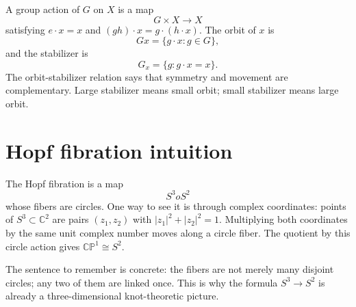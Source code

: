 A group action of \(G\) on \(X\) is a map
\[
  G\times X\to X
\]
satisfying \(e\cdot x=x\) and \((gh)\cdot x=g\cdot(h\cdot x)\).  The orbit of \(x\) is
\[
  Gx=\{g\cdot x:g\in G\},
\]
and the stabilizer is
\[
  G_x=\{g:g\cdot x=x\}.
\]
The orbit-stabilizer relation says that symmetry and movement are complementary.  Large stabilizer means small orbit; small stabilizer means large orbit.

\section{Hopf fibration intuition}

The Hopf fibration is a map
\[
  S^3	o S^2
\]
whose fibers are circles.  One way to see it is through complex coordinates: points of \(S^3\subset\mathbb C^2\) are pairs \((z_1,z_2)\) with \(|z_1|^2+|z_2|^2=1\).  Multiplying both coordinates by the same unit complex number moves along a circle fiber.  The quotient by this circle action gives \(\mathbb{CP}^1\cong S^2\).

The sentence to remember is concrete: the fibers are not merely many disjoint circles; any two of them are linked once.  This is why the formula \(S^3\to S^2\) is already a three-dimensional knot-theoretic picture.
